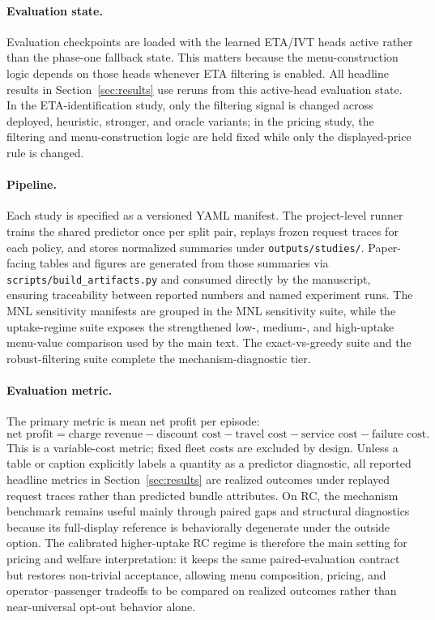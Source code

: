\paragraph{Evaluation state.} Evaluation checkpoints are loaded with the learned ETA/IVT
heads active rather than the phase-one fallback state. This matters because the
menu-construction logic depends on those heads whenever ETA filtering is enabled.
All headline results in Section~\ref{sec:results} use reruns from this active-head
evaluation state. In the ETA-identification study, only the filtering signal is
changed across deployed, heuristic, stronger, and oracle variants; in the pricing
study, the filtering and menu-construction logic are held fixed while only the
displayed-price rule is changed.

\paragraph{Pipeline.} Each study is specified as a versioned YAML manifest. The
project-level runner trains the shared predictor once per split pair, replays frozen
request traces for each policy, and stores normalized summaries under
\texttt{outputs/studies/}. Paper-facing tables and figures are generated from those
summaries via \texttt{scripts/build\_artifacts.py} and consumed directly by the
manuscript, ensuring traceability between reported numbers and named experiment runs.
The MNL sensitivity manifests are grouped in the MNL sensitivity suite, while the
uptake-regime suite exposes the strengthened low-, medium-, and high-uptake menu-value
comparison used by the main text. The exact-vs-greedy suite and the robust-filtering
suite complete the mechanism-diagnostic tier.

\paragraph{Evaluation metric.} The primary metric is mean net profit per episode:
\[
  \text{net profit} = \text{charge revenue} - \text{discount cost} - \text{travel cost} - \text{service cost} - \text{failure cost}.
\]
This is a variable-cost metric; fixed fleet costs are excluded by design. Unless a table or caption explicitly labels a quantity as a predictor diagnostic, all reported headline metrics in Section~\ref{sec:results} are realized outcomes under replayed request traces rather than predicted bundle attributes. On RC, the mechanism benchmark remains useful mainly through paired gaps and structural diagnostics because its full-display reference is behaviorally degenerate under the outside option. The calibrated higher-uptake RC regime is therefore the main setting for pricing and welfare interpretation: it keeps the same paired-evaluation contract but restores non-trivial acceptance, allowing menu composition, pricing, and operator--passenger tradeoffs to be compared on realized outcomes rather than near-universal opt-out behavior alone.
